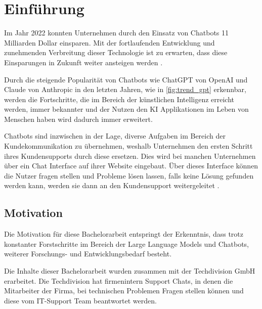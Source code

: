 \chapter{Einführung}
\label{c:intro}
Im Jahr 2022 konnten Unternehmen durch den Einsatz von Chatbots 11 
Milliarden Dollar einsparen. Mit der fortlaufenden Entwicklung und zunehmenden 
Verbreitung dieser Technologie ist zu erwarten, dass diese Einsparungen in Zukunft
 weiter ansteigen werden \cite{tidio}.\par
Durch die steigende Popularität von Chatbots wie ChatGPT von OpenAI \cite{ChatGPT} und Claude von Anthropic \cite{ChatGPT} in 
den letzten Jahren, wie in \ref*{fig:trend_gpt} erkennbar, werden die Fortschritte, die im 
Bereich der künstlichen Intelligenz erreicht werden, immer bekannter und der Nutzen den KI 
Applikationen im Leben von Menschen haben wird dadurch immer erweitert.\par
Chatbots sind inzwischen in der Lage, diverse Aufgaben im Bereich der Kundekommunikation
zu übernehmen, weshalb Unternehmen den ersten Schritt ihres Kundensupports
durch diese ersetzen. Dies wird bei manchen Unternehmen über 
ein Chat Interface auf ihrer Website eingebaut. Über dieses Interface
können die Nutzer fragen stellen und Probleme lösen lassen, falls 
keine Lösung gefunden werden kann, werden sie dann an den Kundensupport 
weitergeleitet \cite{DistroKidHelpCenter}.


\section{Motivation}
\label{s:intro:mot}
Die Motivation für diese Bachelorarbeit entspringt der Erkenntnis, dass
trotz konstanter Forstschritte im Bereich der Large Language Models und 
Chatbots, weiterer Forschungs- und Entwicklungsbedarf besteht.\par

Die Inhalte dieser Bachelorarbeit wurden zusammen mit der Techdivision GmbH erarbeitet.
Die Techdivision hat firmenintern Support Chats, in denen die Mitarbeiter der Firma, 
bei technischen Problemen Fragen stellen können und diese vom IT-Support Team 
beantwortet werden.

